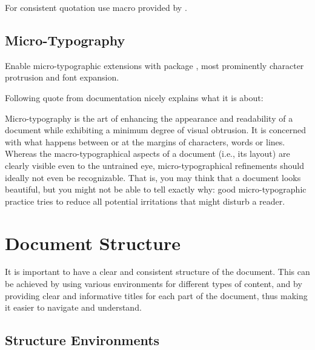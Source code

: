 For consistent quotation use \macro{\enquote} macro provided by .

\subsection{\texorpdfstring{Micro-\!Typography}{Micro-Typography}}%
\label{sub:Micro-Typography}

Enable micro-typographic extensions with package , most prominently character protrusion and font expansion.

Following quote from  documentation nicely explains what it is about:
\begin{displayquote}
    Micro-typography is the art of enhancing the appearance and readability of a
    document while exhibiting a minimum degree of visual obtrusion.
    It is concerned with what happens between or at the margins of characters, words or lines.
    Whereas the macro-typographical aspects of a document (i.e., its layout) are clearly visible even to the untrained eye, micro-typographical refinements should ideally not even be recognizable.
    That is, you may think that a document looks beautiful, but you might not be able to tell exactly why: good micro-typographic practice tries to reduce all potential irritations that might disturb a reader.
\end{displayquote}


\section{Document Structure}%
\label{sec:Document Structure}

It is important to have a clear and consistent structure of the document.
This can be achieved by using various environments for different types of content, and by providing clear and informative titles for each part of the document, thus making it easier to navigate and understand.

\subsection{Structure Environments}%
\label{sub:Structure Environments}

